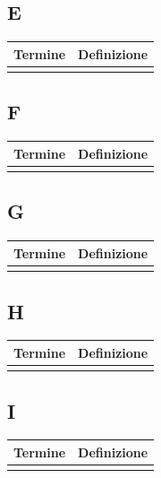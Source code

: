 \documentclass[10pt]{article}
\begin{document}
\subsection{E} %
\begin{tabularx}{\textwidth}{|>{\centering\arraybackslash}l|X|}
\hline
\rowcolor[gray]{0.8}
\textbf{Termine} & \textbf{Definizione}\\
\hline
 & \\
\hline
\end{tabularx}

\subsection{F} %
\begin{tabularx}{\textwidth}{|>{\centering\arraybackslash}l|X|}
\hline
\rowcolor[gray]{0.8}
\textbf{Termine} & \textbf{Definizione}\\
\hline
 & \\
\hline
\end{tabularx}

\subsection{G} %
\begin{tabularx}{\textwidth}{|>{\centering\arraybackslash}l|X|}
\hline
\rowcolor[gray]{0.8}
\textbf{Termine} & \textbf{Definizione}\\
\hline
 & \\
\hline
\end{tabularx}

\subsection{H} %
\begin{tabularx}{\textwidth}{|>{\centering\arraybackslash}l|X|}
\hline
\rowcolor[gray]{0.8}
\textbf{Termine} & \textbf{Definizione}\\
\hline
 & \\
\hline
\end{tabularx}

\subsection{I} %
\begin{tabularx}{\textwidth}{|>{\centering\arraybackslash}l|X|}
\hline
\rowcolor[gray]{0.8}
\textbf{Termine} & \textbf{Definizione}\\
\hline
 & \\
\hline
\end{tabularx}
\end{document}
